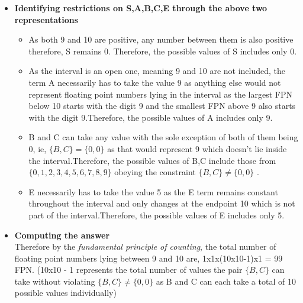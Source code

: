 \documentclass[letterpaper]{exam}
\begin{document}
\begin{questions}
\begin{parts}
\begin{subparts}
\begin{solution}
\begin{itemize}
\begin{center}
\begin{tabular}{|c|c|c|c|c|}
\hline
     \huge{\color{red}0}&\huge{\color{green}1}&\huge{\color{green}0}&\huge{\color{green}0}&\huge{\color{yellow}6}  \\[0.5ex]
\hline
\end{tabular}
\end{center}
\begin{itemize}
\item S is 0 as 10 is positive.
\item A is 1 as it is the first digit(digit before the decimal point) in scientific notation.
\item B and C are 0 as they're the first two significant digits that trail the decimal point.
\item E is 6 as the exponent in scientific notation is 1. Adding the bias 5 to the exponent value, we get the value of E to be 6.
\end{itemize}
\item \textbf{Identifying restrictions on S,A,B,C,E through the above two representations}\\
\begin{itemize}
    \item As both 9 and 10 are positive, any number between them is also positive therefore, S remains 0. Therefore, the possible values of S includes only 0.
    \item As the interval is an open one, meaning 9 and 10 are not included, the term A necessarily has to take the value 9 as anything else would not represent floating point numbers lying in the interval as the largest FPN below 10 starts with the digit 9 and the smallest FPN above 9 also starts with the digit 9.Therefore, the possible values of A includes only 9.
    \item B and C can take any value with the sole exception of both of them being 0, ie,
    $\{B,C\} = \{0,0\}$ as that would represent 9 which doesn't lie inside the interval.Therefore, the possible values of B,C include those from $\{0,1,2,3,4,5,6,7,8,9\}$ obeying the constraint $\{B,C\} \neq \{0,0\}$ .
    \item E necessarily has to take the value 5 as the E term remains constant throughout the interval and only changes at the endpoint 10 which is not part of the interval.Therefore, the possible values of E includes only 5.
\end{itemize}
\item \textbf{Computing the answer}\\
Therefore by the \textit{fundamental principle of counting}, the total number of floating point numbers lying between 9 and 10 are, 1x1x(10x10-1)x1 = 99 FPN. (10x10 - 1 represents the total number of values the pair $\{B,C\}$ can take without violating $\{B,C\} \neq \{0,0\}$ as B and C can each take a total of 10 possible values individually)

\end{itemize}
\end{solution}
\end{subparts}
\end{parts}
\end{questions}
\end{document}
